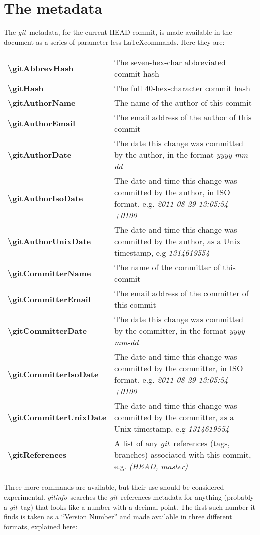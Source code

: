 \documentclass[a4paper,12pt,twoside,openany]{memoir}
\newcommand{\sfit}[1]{\textit{#1}}
\newcommand{\git}{\sfit{git}}
\newcommand{\tpname}{\sfit{gitinfo}}
\begin{document}
\section{The metadata}
The \git\ metadata, for the current HEAD commit,
is made available in the document
as a series of parameter-less \LaTeX commands.
Here they are:
\vspace{0.5\baselineskip}

\noindent
\begin{tabularx}{\textwidth}{@{}>{\ttfamily\bfseries\textbackslash}lX@{}}
gitAbbrevHash&
    The seven-hex-char abbreviated commit hash
\\
gitHash&
    The full 40-hex-character commit hash
\\
gitAuthorName&
    The name of the author of this commit
\\
gitAuthorEmail&
    The email address of the author of this commit
\\
gitAuthorDate&
    The date this change was committed by the author,
    in the format \textit{yyyy-mm-dd}
\\
gitAuthorIsoDate&
    The date and time this change was committed by the author,
    in ISO format, e.g. \textit{2011-08-29 13:05:54 +0100}
\\
gitAuthorUnixDate&
    The date and time this change was committed by the author,
    as a Unix timestamp, e.g \textit{1314619554}
\\
gitCommitterName&
    The name of the committer of this commit
\\
gitCommitterEmail&
    The email address of the committer of this commit
\\
gitCommitterDate&
    The date this change was committed by the committer,
    in the format \textit{yyyy-mm-dd}
\\
gitCommitterIsoDate&
    The date and time this change was committed by the committer,
    in ISO format, e.g. \textit{2011-08-29 13:05:54 +0100}
\\
gitCommitterUnixDate&
    The date and time this change was committed by the committer,
    as a Unix timestamp, e.g \textit{1314619554}
\\
gitReferences&
    A list of any \git\ references (tags, branches) associated
    with this commit, e.g. \textit{ (HEAD, master)}
\\
\end{tabularx}

\vspace{0.5\baselineskip}
Three more commands are available, but their use should be considered
experimental. \tpname\ searches the \git\ references metadata for
anything (probably a \git\ tag) that looks like a number with a decimal point.
The first such number it finds is taken as a ``Version Number''
and made available in three different formats, explained here:
\vspace{0.5\baselineskip}
\end{document}
